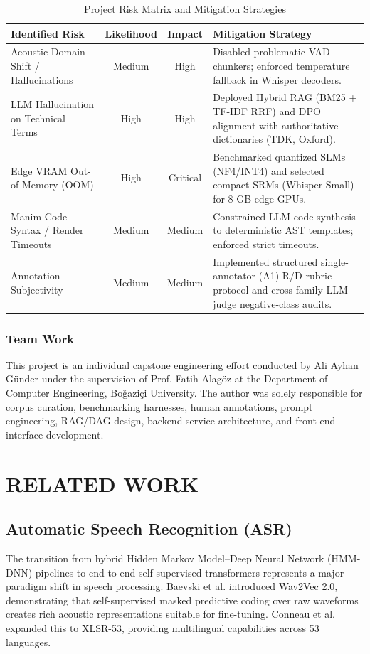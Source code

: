 \documentclass[a4paper,12pt]{report}
\begin{document}
\begin{table}[h!]
\centering
\caption{Project Risk Matrix and Mitigation Strategies}
\label{table:risk_analysis}
\baselineskip
\small
\begin{tabularx}{\textwidth}{|l|c|c|X|}
\hline
\textbf{Identified Risk} & \textbf{Likelihood} & \textbf{Impact} & \textbf{Mitigation Strategy} \\ \hline
Acoustic Domain Shift / Hallucinations & Medium & High & Disabled problematic VAD chunkers; enforced temperature fallback in Whisper decoders. \\ \hline
LLM Hallucination on Technical Terms & High & High & Deployed Hybrid RAG (BM25 + TF-IDF RRF) and DPO alignment with authoritative dictionaries (TDK, Oxford). \\ \hline
Edge VRAM Out-of-Memory (OOM) & High & Critical & Benchmarked quantized SLMs (NF4/INT4) and selected compact SRMs (Whisper Small) for 8 GB edge GPUs. \\ \hline
Manim Code Syntax / Render Timeouts & Medium & Medium & Constrained LLM code synthesis to deterministic AST templates; enforced strict timeouts. \\ \hline
Annotation Subjectivity & Medium & Medium & Implemented structured single-annotator (A1) R/D rubric protocol and cross-family LLM judge negative-class audits. \\ \hline
\end{tabularx}
\end{table}

\subsection{Team Work}
This project is an individual capstone engineering effort conducted by Ali Ayhan Günder under the supervision of Prof. Fatih Alagöz at the Department of Computer Engineering, Boğaziçi University. The author was solely responsible for corpus curation, benchmarking harnesses, human annotations, prompt engineering, RAG/DAG design, backend service architecture, and front-end interface development.


\chapter{RELATED WORK}

\section{Automatic Speech Recognition (ASR)}
The transition from hybrid Hidden Markov Model--Deep Neural Network (HMM-DNN) pipelines to end-to-end self-supervised transformers represents a major paradigm shift in speech processing. Baevski et al. \cite{baevski2020} introduced Wav2Vec 2.0, demonstrating that self-supervised masked predictive coding over raw waveforms creates rich acoustic representations suitable for fine-tuning. Conneau et al. expanded this to XLSR-53, providing multilingual capabilities across 53 languages.
\end{document}
